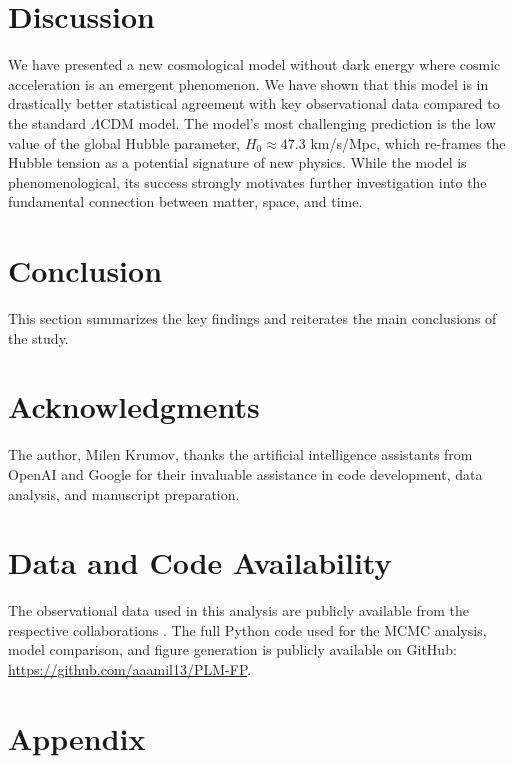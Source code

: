 \documentclass[12pt, a4paper]{article}
\begin{document}
\section{Discussion}
We have presented a new cosmological model without dark energy where cosmic acceleration is an emergent phenomenon. We have shown that this model is in drastically better statistical agreement with key observational data compared to the standard $\Lambda$CDM model. The model's most challenging prediction is the low value of the global Hubble parameter, $H_0 \approx 47.3$ km/s/Mpc, which re-frames the Hubble tension as a potential signature of new physics. While the model is phenomenological, its success strongly motivates further investigation into the fundamental connection between matter, space, and time.

\section{Conclusion}
This section summarizes the key findings and reiterates the main conclusions of the study.

\section*{Acknowledgments}
The author, Milen Krumov, thanks the artificial intelligence assistants from OpenAI and Google for their invaluable assistance in code development, data analysis, and manuscript preparation.

\section*{Data and Code Availability}
The observational data used in this analysis are publicly available from the respective collaborations \cite{PantheonPlus, BAO_compilation, Planck2018}. The full Python code used for the MCMC analysis, model comparison, and figure generation is publicly available on GitHub: \href{https://github.com/aaamil13/PLM-FP}{https://github.com/aaamil13/PLM-FP}.




\appendix
\section{Appendix}
\end{document}
